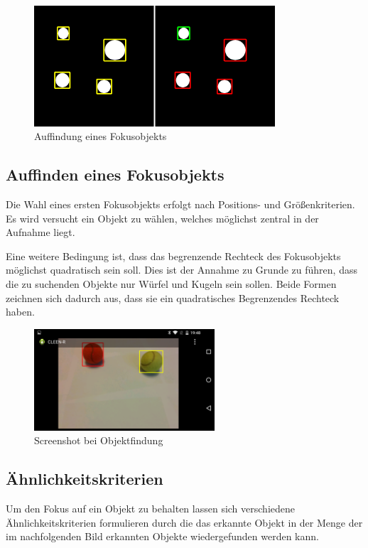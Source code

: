 \pagebreak

\begin{figure}[h]
\centering
\includegraphics[width=0.8\textwidth]{Bilder/Workloop/Markierung}
\caption{Auffindung eines Fokusobjekts}
\label{fig:Markierung}
\end{figure}

\subsection{Auffinden eines Fokusobjekts}
Die Wahl eines ersten Fokusobjekts erfolgt nach Positions- und Größenkriterien. Es wird versucht ein Objekt zu wählen, welches möglichst zentral in der Aufnahme liegt. 

Eine weitere Bedingung ist, dass das begrenzende Rechteck des Fokusobjekts möglichst quadratisch sein soll. Dies ist der Annahme zu Grunde zu führen, dass die zu suchenden Objekte nur Würfel und Kugeln sein sollen. Beide Formen zeichnen sich dadurch aus, dass sie ein quadratisches Begrenzendes Rechteck haben.

\begin{figure}[h]
\centering
\includegraphics[width=0.6\textwidth]{Bilder/Workloop/ObjectFindingScreenshot}
\caption{Screenshot bei Objektfindung}
\label{fig:ObjektfindungScreenshot}
\end{figure}

\subsection{Ähnlichkeitskriterien}
\label{subsec:Similarity}
Um den Fokus auf ein Objekt zu behalten lassen sich verschiedene Ähnlichkeitskriterien formulieren durch die das erkannte Objekt in der Menge der im nachfolgenden Bild erkannten Objekte wiedergefunden werden kann.



